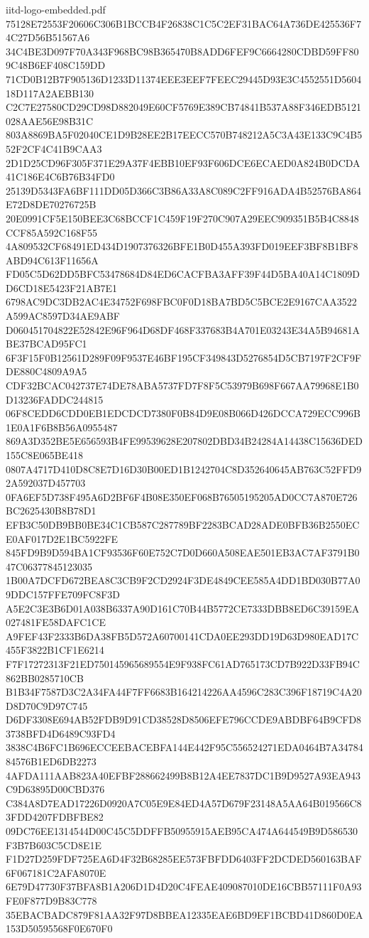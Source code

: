\begin{filecontents*}[overwrite]{iitd-logo-embedded.pdf}
75128E72553F20606C306B1BCCB4F26838C1C5C2EF31BAC64A736DE425536F74C27D56B51567A6
34C4BE3D097F70A343F968BC98B365470B8ADD6FEF9C6664280CDBD59FF809C48B6EF408C159DD
71CD0B12B7F905136D1233D11374EEE3EEF7FEEC29445D93E3C4552551D560418D117A2AEBB130
C2C7E27580CD29CD98D882049E60CF5769E389CB74841B537A88F346EDB5121028AAE56E98B31C
803A8869BA5F02040CE1D9B28EE2B17EECC570B748212A5C3A43E133C9C4B552F2CF4C41B9CAA3
2D1D25CD96F305F371E29A37F4EBB10EF93F606DCE6ECAED0A824B0DCDA41C186E4C6B76B34FD0
25139D5343FA6BF111DD05D366C3B86A33A8C089C2FF916ADA4B52576BA864E72D8DE70276725B
20E0991CF5E150BEE3C68BCCF1C459F19F270C907A29EEC909351B5B4C8848CCF85A592C168F55
4A809532CF68491ED434D1907376326BFE1B0D455A393FD019EEF3BF8B1BF8ABD94C613F11656A
FD05C5D62DD5BFC53478684D84ED6CACFBA3AFF39F44D5BA40A14C1809DD6CD18E5423F21AB7E1
6798AC9DC3DB2AC4E34752F698FBC0F0D18BA7BD5C5BCE2E9167CAA3522A599AC8597D34AE9ABF
D060451704822E52842E96F964D68DF468F337683B4A701E03243E34A5B94681ABE37BCAD95FC1
6F3F15F0B12561D289F09F9537E46BF195CF349843D5276854D5CB7197F2CF9FDE880C4809A9A5
CDF32BCAC042737E74DE78ABA5737FD7F8F5C53979B698F667AA79968E1B0D13236FADDC244815
06F8CEDD6CDD0EB1EDCDCD7380F0B84D9E08B066D426DCCA729ECC996B1E0A1F6B8B56A0955487
869A3D352BE5E656593B4FE99539628E207802DBD34B24284A14438C15636DED155C8E065BE418
0807A4717D410D8C8E7D16D30B00ED1B1242704C8D352640645AB763C52FFD92A592037D457703
0FA6EF5D738F495A6D2BF6F4B08E350EF068B76505195205AD0CC7A870E726BC2625430B8B78D1
EFB3C50DB9BB0BE34C1CB587C287789BF2283BCAD28ADE0BFB36B2550ECE0AF017D2E1BC5922FE
845FD9B9D594BA1CF93536F60E752C7D0D660A508EAE501EB3AC7AF3791B047C06377845123035
1B00A7DCFD672BEA8C3CB9F2CD2924F3DE4849CEE585A4DD1BD030B77A09DDC157FFE709FC8F3D
A5E2C3E3B6D01A038B6337A90D161C70B44B5772CE7333DBB8ED6C39159EA027481FE58DAFC1CE
A9FEF43F2333B6DA38FB5D572A60700141CDA0EE293DD19D63D980EAD17C455F3822B1CF1E6214
F7F17272313F21ED750145965689554E9F938FC61AD765173CD7B922D33FB94C862BB0285710CB
B1B34F7587D3C2A34FA44F7FF6683B164214226AA4596C283C396F18719C4A20D8D70C9D97C745
D6DF3308E694AB52FDB9D91CD38528D8506EFE796CCDE9ABDBF64B9CFD83738BFD4D6489C93FD4
3838C4B6FC1B696ECCEEBACEBFA144E442F95C556524271EDA0464B7A3478484576B1ED6DB2273
4AFDA111AAB823A40EFBF288662499B8B12A4EE7837DC1B9D9527A93EA943C9D63895D00CBD376
C384A8D7EAD17226D0920A7C05E9E84ED4A57D679F23148A5AA64B019566C83FDD4207FDBFBE82
09DC76EE1314544D00C45C5DDFFB50955915AEB95CA474A644549B9D586530F3B7B603C5CD8E1E
F1D27D259FDF725EA6D4F32B68285EE573FBFDD6403FF2DCDED560163BAF6F067181C2AFA8070E
6E79D47730F37BFA8B1A206D1D4D20C4FEAE409087010DE16CBB57111F0A93FE0F877D9B83C778
35EBACBADC879F81AA32F97D8BBEA12335EAE6BD9EF1BCBD41D860D0EA153D50595568F0E670F0

\end{filecontents*}
